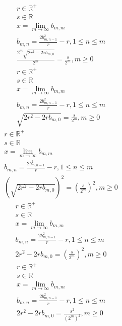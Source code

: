 \documentclass[a4paper,12pt]{report}
\begin{document}
\begin{subequations}
\begin{gather}
r \in \mathbb{R}^+ \\
s \in \mathbb{R} \\
x = \lim \limits_{m \to \infty} b_{m,m} \\
b_{m,n} = \frac{2b_{m,n-1}^2}{r} - r, 1 \leq n \leq m \\
\frac{2^m \sqrt{2r^2 - 2rb_{m,0}}}{2^m} = \frac{s}{2^m}, m \geq 0
\end{gather}
\end{subequations}
\begin{subequations}
\begin{gather}
r \in \mathbb{R}^+ \\
s \in \mathbb{R} \\
x = \lim \limits_{m \to \infty} b_{m,m} \\
b_{m,n} = \frac{2b_{m,n-1}^2}{r} - r, 1 \leq n \leq m \\
\sqrt{2r^2 - 2rb_{m,0}} = \frac{s}{2^m}, m \geq 0
\end{gather}
\end{subequations}
\begin{subequations}
\begin{gather}
r \in \mathbb{R}^+ \\
s \in \mathbb{R} \\
x = \lim \limits_{m \to \infty} b_{m,m} \\
b_{m,n} = \frac{2b_{m,n-1}^2}{r} - r, 1 \leq n \leq m \\
\left(\sqrt{2r^2 - 2rb_{m,0}}\right)^2 = \left(\frac{s}{2^m}\right)^2, m \geq 0
\end{gather}
\end{subequations}
\begin{subequations}
\begin{gather}
r \in \mathbb{R}^+ \\
s \in \mathbb{R} \\
x = \lim \limits_{m \to \infty} b_{m,m} \\
b_{m,n} = \frac{2b_{m,n-1}^2}{r} - r, 1 \leq n \leq m \\
2r^2 - 2rb_{m,0} = \left(\frac{s}{2^m}\right)^2, m \geq 0
\end{gather}
\end{subequations}
\begin{subequations}
\begin{gather}
r \in \mathbb{R}^+ \\
s \in \mathbb{R} \\
x = \lim \limits_{m \to \infty} b_{m,m} \\
b_{m,n} = \frac{2b_{m,n-1}^2}{r} - r, 1 \leq n \leq m \\
2r^2 - 2rb_{m,0} = \frac{s^2}{(2^m)^2}, m \geq 0
\end{gather}
\end{subequations}
\end{document}
